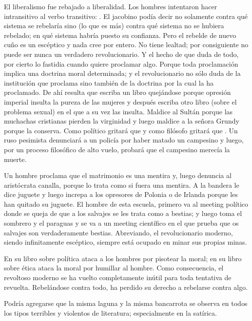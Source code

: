 El liberalismo fue rebajado a liberalidad. Los hombres intentaron hacer intransitivo al verbo
transitivo: . El jacobino podía decir no solamente contra qué sistema se rebelaría sino (lo
que es más) contra qué sistema no se hubiera rebelado; en qué sistema habría puesto su confianza. Pero el
rebelde de nuevo cuño es un escéptico y nada cree por entero. No tiene lealtad; por consiguiente no puede
ser nunca un verdadero revolucionario. Y el hecho de que duda de todo, por cierto lo fastidia cuando
quiere proclamar algo. Porque toda proclamación implica una doctrina moral determinada; y el
revolucionario no sólo duda de la institución que proclama sino también de la doctrina por la cual la ha
proclamado. De ahí resulta que escriba un libro quejándose porque opresión imperial insulta la pureza de
las mujeres y después escriba otro libro (sobre el problema sexual) en el que a su vez las insulta. Maldice
al Sultán porque las muchachas cristianas pierden la virginidad y luego maldice a la señora Grundy
porque la conserva. Como político gritará que  y como filósofo gritará
que . Un ruso pesimista denunciará a un policía por haber matado un
campesino y luego, por un proceso filosófico de alto vuelo, probará que el campesino merecía la muerte.

Un hombre proclama que el matrimonio es una mentira y, luego denuncia al aristócrata canalla, porque lo
trata como si fuera una mentira. A la bandera le dice juguete y luego increpa a los opresores de Polonia o
de Irlanda porque les han quitado su juguete. El hombre de esta escuela, primero va al meeting político
donde se queja de que a los salvajes se les trata como a bestias; y luego toma el sombrero y el paraguas y
se va a un meeting científico en el que prueba que os salvajes son verdaderamente bestias. Abreviando, el
revolucionario moderno, siendo infinitamente escéptico, siempre está ocupado en minar sus propias
minas.

En su libro sobre política ataca a los hombres por pisotear la moral; en su libro sobre ética ataca la
moral por humillar al hombre. Como consecuencia, el revoltoso moderno se ha vuelto completamente
inútil para toda tentativa de revuelta. Rebelándose contra todo, ha perdido su derecho a rebelarse contra
algo.

Podría agregarse que la misma laguna y la misma bancarrota se observa en todos los tipos terribles
y violentos de literatura; especialmente en la satírica.

